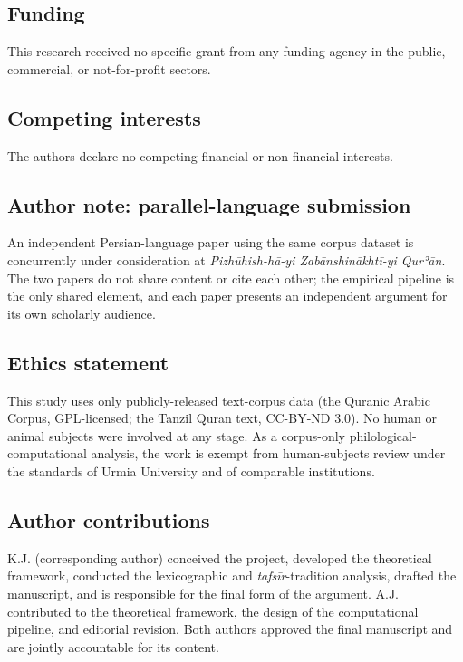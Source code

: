 \documentclass[11pt,a4paper]{article}
\begin{document}
\subsection{Funding}\label{funding}

This research received no specific grant from any funding agency in the
public, commercial, or not-for-profit sectors.

\subsection{Competing interests}\label{competing-interests}

The authors declare no competing financial or non-financial interests.

\subsection{Author note: parallel-language
submission}\label{author-note-parallel-language-submission}

An independent Persian-language paper using the same corpus dataset is
concurrently under consideration at \emph{Pizhūhish-hā-yi
Zabānshinākhtī-yi Qurʾān}. The two papers do not share content or cite
each other; the empirical pipeline is the only shared element, and each
paper presents an independent argument for its own scholarly audience.

\subsection{Ethics statement}\label{ethics-statement}

This study uses only publicly-released text-corpus data (the Quranic
Arabic Corpus, GPL-licensed; the Tanzil Quran text, CC-BY-ND 3.0). No
human or animal subjects were involved at any stage. As a corpus-only
philological-computational analysis, the work is exempt from
human-subjects review under the standards of Urmia University and of
comparable institutions.

\subsection{Author contributions}\label{author-contributions}

K.J. (corresponding author) conceived the project, developed the
theoretical framework, conducted the lexicographic and
\emph{tafsīr}-tradition analysis, drafted the manuscript, and is
responsible for the final form of the argument. A.J. contributed to the
theoretical framework, the design of the computational pipeline, and
editorial revision. Both authors approved the final manuscript and are
jointly accountable for its content.
\end{document}
